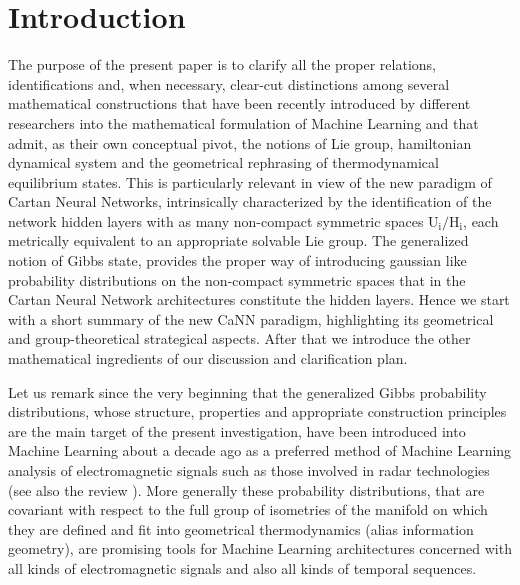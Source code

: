 \documentclass[10pt,a4paper]{article}
\begin{document}
\section{Introduction} \label{introibo}
The purpose of the present paper is to clarify all the proper relations, identifications and, when necessary, clear-cut distinctions among several mathematical constructions that have been recently  introduced by different researchers  into the mathematical formulation of Machine Learning and that admit, as their own conceptual pivot, the notions of Lie group, hamiltonian dynamical system and the geometrical rephrasing of thermodynamical equilibrium states. This is particularly relevant in view of the new paradigm of Cartan Neural Networks\cite{pgtstheory,TSnaviga,naviga,tassellandum}, intrinsically characterized by the identification of the network hidden layers with as many non-compact symmetric spaces $\mathrm{U_i/H_i}$, each metrically equivalent to an appropriate solvable Lie group. The generalized notion of Gibbs state, provides the proper way of introducing gaussian like probability distributions on the non-compact symmetric spaces that in the Cartan Neural Network architectures constitute the hidden layers.  Hence we start with a short summary of the new  CaNN paradigm, highlighting its geometrical and group-theoretical strategical aspects. After that we introduce the other mathematical ingredients of our discussion and clarification plan.
\par Let us remark since the very beginning that the generalized Gibbs probability distributions, whose structure, properties and appropriate construction principles are the main target of the present investigation, have been introduced into Machine Learning about a decade ago as a preferred method of Machine Learning analysis of electromagnetic signals such as those involved in radar technologies \cite{radarone}(see also the review \cite{ondoso}). More generally these probability distributions, that are covariant with respect to the full group of isometries of the manifold on which they are defined and fit into geometrical thermodynamics (alias information geometry), are promising tools for Machine Learning architectures concerned with all kinds of electromagnetic signals and also all kinds of temporal sequences.
\end{document}

